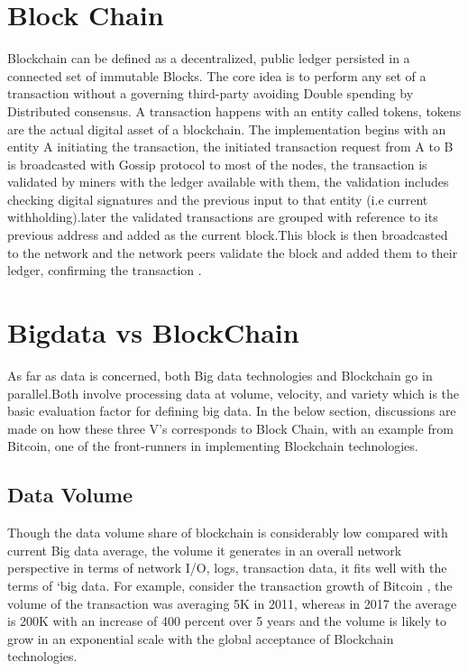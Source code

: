 \documentclass[sigconf]{acmart}
\begin{document}
\section{Block Chain}
  Blockchain can be defined as a decentralized, public ledger persisted in a connected set of immutable Blocks. The core idea is to perform any set of a transaction without a governing third-party avoiding Double spending by Distributed consensus. A transaction happens with an entity called tokens, tokens are the actual digital asset of a blockchain. The implementation begins with an entity A initiating the transaction, the initiated transaction request from A to B is broadcasted with Gossip protocol to most of the nodes, the transaction is validated by miners with the ledger available with them, the validation includes checking digital signatures and the previous input to that entity (i.e current withholding).later the validated transactions are grouped with reference to its previous address and added as the current block.This block is then broadcasted to the network and the network peers validate the block and added them to their ledger, confirming the transaction \cite{Bitcoin}. 
  
\section{Bigdata vs BlockChain}
As far as data is concerned, both Big data technologies and Blockchain go in parallel.Both involve processing data at volume, velocity, and variety which is the basic evaluation factor for defining big data. In the below section, discussions are made on how these three V's corresponds to Block Chain, with an example from Bitcoin, one of the front-runners in implementing Blockchain technologies.

\subsection{Data Volume}
Though the data volume share of blockchain is considerably low compared with current Big data average, the volume it generates in an overall network perspective in terms of network I/O, logs, transaction data, it fits well with the terms of `big data. For example, consider the transaction growth of Bitcoin \cite{bitcointrans}, the volume of the transaction was averaging 5K in 2011, whereas in 2017 the average is 200K with an increase of 400 percent over 5 years and the volume is likely to grow in an exponential scale with the global acceptance of Blockchain technologies. 
\end{document}
